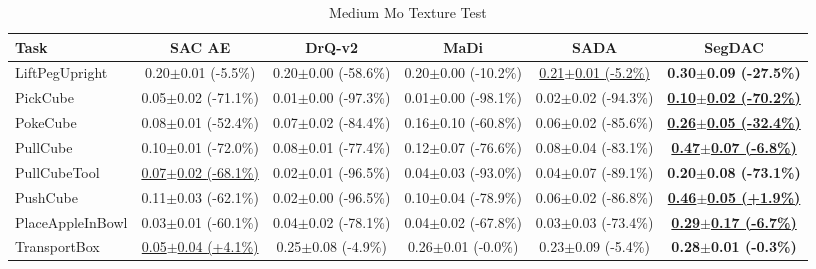 \begin{table}[htbp]
\centering
\scriptsize
\caption{Medium Mo Texture Test}
\label{tab:appendix_motexturetest_medium}
\begin{adjustbox}{max width=\textwidth}
\begin{tabular}{l*{5}{c}}
\toprule
\textbf{Task} & \textbf{SAC AE} & \textbf{DrQ-v2} & \textbf{MaDi} & \textbf{SADA} & \textbf{SegDAC} \\
\midrule
LiftPegUpright & 0.20$\pm$0.01 \scriptsize{(-5.5\%)} & 0.20$\pm$0.00 \scriptsize{(-58.6\%)} & 0.20$\pm$0.00 \scriptsize{(-10.2\%)} & \underline{0.21$\pm$0.01 \scriptsize{(-5.2\%)}} & \textbf{0.30$\pm$0.09 \scriptsize{(-27.5\%)}} \\
PickCube & 0.05$\pm$0.02 \scriptsize{(-71.1\%)} & 0.01$\pm$0.00 \scriptsize{(-97.3\%)} & 0.01$\pm$0.00 \scriptsize{(-98.1\%)} & 0.02$\pm$0.02 \scriptsize{(-94.3\%)} & \textbf{\underline{0.10$\pm$0.02 \scriptsize{(-70.2\%)}}} \\
PokeCube & 0.08$\pm$0.01 \scriptsize{(-52.4\%)} & 0.07$\pm$0.02 \scriptsize{(-84.4\%)} & 0.16$\pm$0.10 \scriptsize{(-60.8\%)} & 0.06$\pm$0.02 \scriptsize{(-85.6\%)} & \textbf{\underline{0.26$\pm$0.05 \scriptsize{(-32.4\%)}}} \\
PullCube & 0.10$\pm$0.01 \scriptsize{(-72.0\%)} & 0.08$\pm$0.01 \scriptsize{(-77.4\%)} & 0.12$\pm$0.07 \scriptsize{(-76.6\%)} & 0.08$\pm$0.04 \scriptsize{(-83.1\%)} & \textbf{\underline{0.47$\pm$0.07 \scriptsize{(-6.8\%)}}} \\
PullCubeTool & \underline{0.07$\pm$0.02 \scriptsize{(-68.1\%)}} & 0.02$\pm$0.01 \scriptsize{(-96.5\%)} & 0.04$\pm$0.03 \scriptsize{(-93.0\%)} & 0.04$\pm$0.07 \scriptsize{(-89.1\%)} & \textbf{0.20$\pm$0.08 \scriptsize{(-73.1\%)}} \\
PushCube & 0.11$\pm$0.03 \scriptsize{(-62.1\%)} & 0.02$\pm$0.00 \scriptsize{(-96.5\%)} & 0.10$\pm$0.04 \scriptsize{(-78.9\%)} & 0.06$\pm$0.02 \scriptsize{(-86.8\%)} & \textbf{\underline{0.46$\pm$0.05 \scriptsize{(+1.9\%)}}} \\
PlaceAppleInBowl & 0.03$\pm$0.01 \scriptsize{(-60.1\%)} & 0.04$\pm$0.02 \scriptsize{(-78.1\%)} & 0.04$\pm$0.02 \scriptsize{(-67.8\%)} & 0.03$\pm$0.03 \scriptsize{(-73.4\%)} & \textbf{\underline{0.29$\pm$0.17 \scriptsize{(-6.7\%)}}} \\
TransportBox & \underline{0.05$\pm$0.04 \scriptsize{(+4.1\%)}} & 0.25$\pm$0.08 \scriptsize{(-4.9\%)} & 0.26$\pm$0.01 \scriptsize{(-0.0\%)} & 0.23$\pm$0.09 \scriptsize{(-5.4\%)} & \textbf{0.28$\pm$0.01 \scriptsize{(-0.3\%)}} \\
\bottomrule
\end{tabular}
\end{adjustbox}
\end{table}

